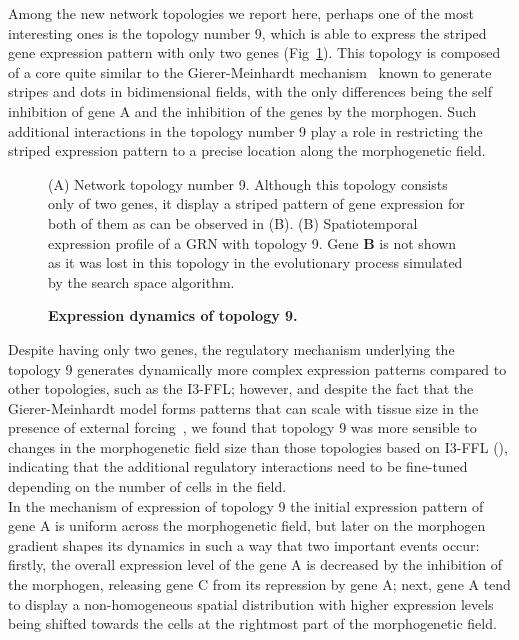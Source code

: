 \documentclass[10pt,letterpaper]{article}
\begin{document}
Among the new network topologies we report here, perhaps one of the most
interesting ones is the topology number 9, which is able to express the striped
gene expression pattern with only two genes (Fig~\ref{fig:topol9}).
This topology is composed of a core quite similar to the Gierer-Meinhardt
mechanism~\cite{giererMeinh1972, meinhardt2000} known to generate
stripes and dots in bidimensional fields, with the only differences being
the self inhibition of gene A and the inhibition of the genes by the morphogen.
Such additional interactions in the topology number 9 play a role in restricting
the striped expression pattern to a precise location along the morphogenetic field.

\begin{figure}[!h]
 \caption{\bf Expression dynamics of topology 9.}
 (A) Network topology number 9. Although this topology consists only of two
 genes, it display a striped pattern of gene expression for both of them as
 can be observed in (B). (B) Spatiotemporal expression profile of a GRN
 with topology 9. Gene \textbf{B} is not shown as it was lost in this topology
 in the evolutionary process simulated by the search space algorithm.
 \label{fig:topol9}
\end{figure}

Despite having only two genes, the regulatory mechanism underlying
the topology 9 generates dynamically more complex expression patterns
compared to other topologies, such as the
I3-FFL; however, and despite the fact that the Gierer-Meinhardt model forms
patterns that can scale with tissue size in the presence of external
forcing~\cite{shoaf1984, ishihara_2006}, we found that topology 9
was more sensible to changes in the morphogenetic field size than those
topologies based on I3-FFL (),
indicating that the additional regulatory interactions need to be fine-tuned
depending on the number of cells in the field.\\

In the mechanism of expression of topology 9 the initial expression
pattern of gene A is uniform across the morphogenetic field, but later
on the morphogen gradient shapes its dynamics in such a way that
two important events occur: firstly, the overall expression level of the
gene A is decreased by the inhibition of the morphogen, releasing
gene C from its repression by gene A; next, gene A tend to display a
non-homogeneous spatial distribution with higher expression levels
being shifted towards the cells at the rightmost part of the morphogenetic
field.\\
\end{document}
